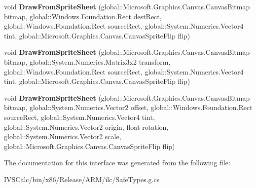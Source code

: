 \begin{DoxyCompactItemize}
\item 
\mbox{\label{interface_microsoft_1_1_graphics_1_1_canvas_1_1_i_canvas_sprite_batch_ad293d5fbb3ed75a7349a5af546ee5a77}} 
void {\bfseries Draw\+From\+Sprite\+Sheet} (global\+::\+Microsoft.\+Graphics.\+Canvas.\+Canvas\+Bitmap bitmap, global\+::\+Windows.\+Foundation.\+Rect dest\+Rect, global\+::\+Windows.\+Foundation.\+Rect source\+Rect, global\+::\+System.\+Numerics.\+Vector4 tint, global\+::\+Microsoft.\+Graphics.\+Canvas.\+Canvas\+Sprite\+Flip flip)
\item 
\mbox{\label{interface_microsoft_1_1_graphics_1_1_canvas_1_1_i_canvas_sprite_batch_a16ce9e3d6fcd3a35b2ca5ddc20b167fa}} 
void {\bfseries Draw\+From\+Sprite\+Sheet} (global\+::\+Microsoft.\+Graphics.\+Canvas.\+Canvas\+Bitmap bitmap, global\+::\+System.\+Numerics.\+Matrix3x2 transform, global\+::\+Windows.\+Foundation.\+Rect source\+Rect, global\+::\+System.\+Numerics.\+Vector4 tint, global\+::\+Microsoft.\+Graphics.\+Canvas.\+Canvas\+Sprite\+Flip flip)
\item 
\mbox{\label{interface_microsoft_1_1_graphics_1_1_canvas_1_1_i_canvas_sprite_batch_ac11b7ca2c7e66d7f79048004f3a75b53}} 
void {\bfseries Draw\+From\+Sprite\+Sheet} (global\+::\+Microsoft.\+Graphics.\+Canvas.\+Canvas\+Bitmap bitmap, global\+::\+System.\+Numerics.\+Vector2 offset, global\+::\+Windows.\+Foundation.\+Rect source\+Rect, global\+::\+System.\+Numerics.\+Vector4 tint, global\+::\+System.\+Numerics.\+Vector2 origin, float rotation, global\+::\+System.\+Numerics.\+Vector2 scale, global\+::\+Microsoft.\+Graphics.\+Canvas.\+Canvas\+Sprite\+Flip flip)
\end{DoxyCompactItemize}


The documentation for this interface was generated from the following file\+:\begin{DoxyCompactItemize}
\item 
I\+V\+S\+Calc/bin/x86/\+Release/\+A\+R\+M/ilc/Safe\+Types.\+g.\+cs\end{DoxyCompactItemize}
